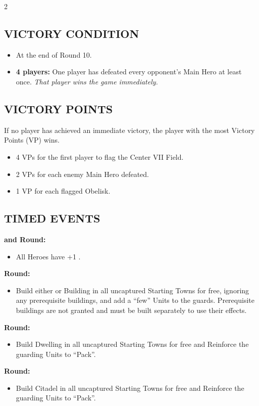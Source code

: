 \begin{multicols}{2}
\subsection*{\MakeUppercase{Victory Condition}}
\begin{itemize}
  \item At the end of Round 10.
  \item \textbf{4 players:} One player has defeated every opponent's Main Hero at least once. \textit{That player wins the game immediately.}
\end{itemize}

\subsection*{\MakeUppercase{Victory Points}}
If no player has achieved an immediate victory,
the player with the most Victory Points (VP) wins.
\begin{itemize}
  \item 4 VPs for the first player to flag the Center VII Field.
  \item 2 VPs for each enemy Main Hero defeated.
  \item 1 VP for each flagged Obelisk.
\end{itemize}

\subsection*{\MakeUppercase{Timed Events}}
\textbf{ and  Round:}
\begin{itemize}
  \item All Heroes have +1 .
\end{itemize}
\textbf{ Round:}
\begin{itemize}
  \item Build either  or  Building in all uncaptured Starting Towns for free, ignoring any
prerequisite buildings, and add a ``few''  Units to the guards. Prerequisite buildings are not granted and must be built
separately to use their effects.
\end{itemize}
\textbf{ Round:}
\begin{itemize}
  \item Build  Dwelling in all uncaptured Starting Towns for free and Reinforce the guarding  Units to ``Pack''.
\end{itemize}
\textbf{ Round:}
\begin{itemize}
  \item Build Citadel in all uncaptured Starting Towns for free and Reinforce the guarding  Units to ``Pack''.
\end{itemize}


\end{multicols}
